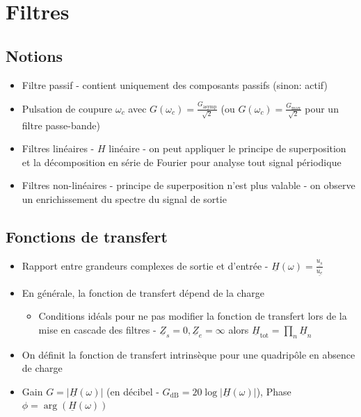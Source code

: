 \documentclass[openany]{book}
\begin{document}
\section{Filtres}

\subsection{Notions}
\begin{itemize}
    \item Filtre passif - contient uniquement des composants passifs (sinon: actif)
    \item Pulsation de coupure $\omega_c$ avec $G(\omega_c) = \frac{G_{\text{asymp}}}{\sqrt{2}}$ (ou $G(\omega_c) = \frac{G_{\text{max}}}{\sqrt{2}}$ pour un filtre passe-bande)
    \item Filtres linéaires - $H$ linéaire - on peut appliquer le principe de superposition et la décomposition en série de Fourier pour analyse tout signal périodique
    \item Filtres non-linéaires - principe de superposition n'est plus valable - on observe un enrichissement du spectre du signal de sortie
\end{itemize}

\subsection{Fonctions de transfert}
\begin{itemize}
    \item Rapport entre grandeurs complexes de sortie et d'entrée - $ \underline{H}(\omega) = \frac{\underline{u_s}}{\underline{u_e}} $
    \item En générale, la fonction de transfert dépend de la charge 
    \begin{itemize}
        \item Conditions idéals pour ne pas modifier la fonction de transfert lors de la mise en cascade des filtres - $\underline{Z}_s = 0, \underline{Z}_e = \infty$ alors $ \underline{H}_{\text{tot}} = \prod_{n} \underline{H}_n $
    \end{itemize}
    \item On définit la fonction de transfert intrinsèque pour une quadripôle en absence de charge
    \item Gain $ G = |\underline{H}(\omega)| $ (en décibel - $ G_{\text{dB}} = 20\log{|\underline{H}(\omega)|} $), Phase $ \phi = \arg(\underline{H}(\omega)) $
\end{itemize}
\end{document}
